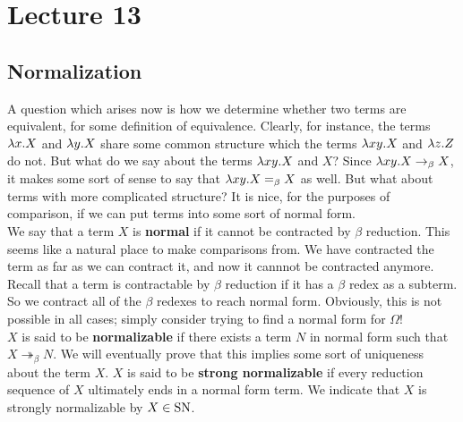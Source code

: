 \chapter{Lecture 13}

\section{Normalization}
A question which arises now is how we determine whether two terms are equivalent, for some definition of equivalence. Clearly, for instance, the terms $\lambda x.X$ and $\lambda y.X$ share some common structure which the terms $\lambda xy.X$ and $\lambda z.Z$ do not. But what do we say about the terms $\lambda xy.X$ and $X$? Since $\lambda xy.X \rightarrow_\beta X$, it makes some sort of sense to say that $\lambda xy.X =_\beta X$ as well. But what about terms with more complicated structure? It is nice, for the purposes of comparison, if we can put terms into some sort of normal form.\\

We say that a term $X$ is \textbf{normal} if it cannot be contracted by $\beta$ reduction. This seems like a natural place to make comparisons from. We have contracted the term as far as we can contract it, and now it cannnot be contracted anymore. Recall that a term is contractable by $\beta$ reduction if it has a $\beta$ redex as a subterm. So we contract all of the $\beta$ redexes to reach normal form. Obviously, this is not possible in all cases; simply consider trying to find a normal form for $\Omega$!\\

$X$ is said to be \textbf{normalizable} if there exists a term $N$ in normal form such that $X \twoheadrightarrow_\beta N$. We will eventually prove that this implies some sort of uniqueness about the term $X$. $X$ is said to be \textbf{strong normalizable} if every reduction sequence of $X$ ultimately ends in a normal form term. We indicate that $X$ is strongly normalizable by $X \in \hbox{SN}$.\\

